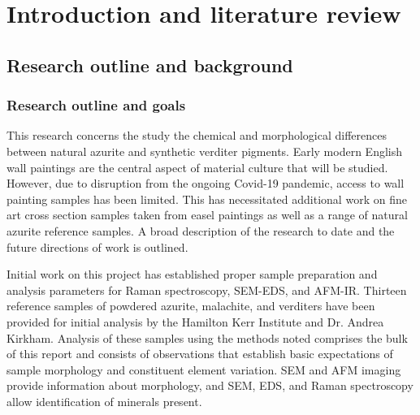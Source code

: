 

\chapter{Introduction and literature review}


\ifpdf
    \graphicspath{{Chapter1/Figs/Raster/}{Chapter1/Figs/PDF/}{Chapter1/Figs/}}
\else
    \graphicspath{{Chapter1/Figs/Vector/}{Chapter1/Figs/}}
\fi


\section[Research outline and background]{Research outline and background} %
\label{section1.1}

\subsection[Research outline and goals]{Research outline and goals}
\label{subsection1.1.1}

This research concerns the study the chemical and morphological differences between natural azurite and synthetic verditer pigments. Early modern English wall paintings are the central aspect of material culture that will be studied. However, due to disruption from the ongoing Covid-19 pandemic, access to wall painting samples has been limited. This has necessitated additional work on fine art cross section samples taken from easel paintings as well as a range of natural azurite reference samples. A broad description of the research to date and the future directions of work is outlined.

Initial work on this project has established proper sample preparation and analysis parameters for Raman spectroscopy, SEM-EDS, and AFM-IR. Thirteen reference samples of powdered azurite, malachite, and verditers have been provided for initial analysis by the Hamilton Kerr Institute and Dr. Andrea Kirkham. Analysis of these samples using the methods noted comprises the bulk of this report and consists of observations that establish basic expectations of sample morphology and constituent element variation. SEM and AFM imaging provide information about morphology, and SEM, EDS, and Raman spectroscopy allow identification of minerals present.

